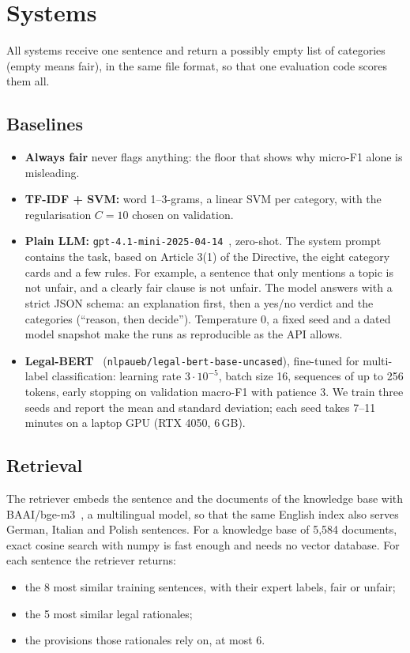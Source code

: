 \section{Systems}
\label{sec:systems}

All systems receive one sentence and return a possibly empty list of categories (empty means fair), in the same file format, so that one evaluation code scores them all.

\subsection{Baselines}
\label{sec:baselines}

\begin{itemize}
  \item \textbf{Always fair} never flags anything: the floor that shows why micro-F1 alone is misleading.
  \item \textbf{TF-IDF + SVM:} word 1--3-grams, a linear SVM per category, with the regularisation $C=10$ chosen on validation.
  \item \textbf{Plain LLM:} \texttt{gpt-4.1-mini-2025-04-14}~\citep{openai2025gpt41}, zero-shot. The system prompt contains the task, based on Article 3(1) of the Directive, the eight category cards and a few rules. For example, a sentence that only mentions a topic is not unfair, and a clearly fair clause is not unfair. The model answers with a strict JSON schema: an explanation first, then a yes/no verdict and the categories (``reason, then decide''). Temperature 0, a fixed seed and a dated model snapshot make the runs as reproducible as the API allows.
  \item \textbf{Legal-BERT}~\citep{chalkidis2020legalbert} (\texttt{nlpaueb/legal-bert-base-uncased}), fine-tuned for multi-label classification: learning rate $3\cdot10^{-5}$, batch size 16, sequences of up to 256 tokens, early stopping on validation macro-F1 with patience 3. We train three seeds and report the mean and standard deviation; each seed takes 7--11 minutes on a laptop GPU (RTX 4050, 6\,GB).
\end{itemize}

\subsection{Retrieval}
\label{sec:retrieval}

The retriever embeds the sentence and the documents of the knowledge base with BAAI/bge-m3~\citep{chen2024bgem3}, a multilingual model, so that the same English index also serves German, Italian and Polish sentences. For a knowledge base of 5,584 documents, exact cosine search with numpy is fast enough and needs no vector database. For each sentence the retriever returns:
\begin{itemize}
  \item the 8 most similar training sentences, with their expert labels, fair or unfair;
  \item the 5 most similar legal rationales;
  \item the provisions those rationales rely on, at most 6.
\end{itemize}

